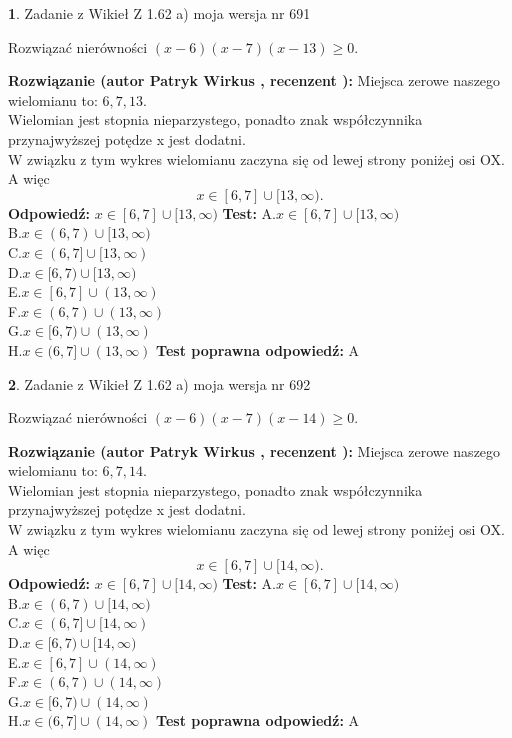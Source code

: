 \documentclass[12pt, a4paper]{article}
\theoremstyle{definition} %
\newtheorem{zad}{}
\newcommand{\zadStart}[1]{\begin{zad}#1\newline}
\newcommand{\zadStop}{\end{zad}}
\newcommand{\rozwStart}[2]{\noindent \textbf{Rozwiązanie (autor #1 , recenzent #2): }\newline}
\newcommand{\rozwStop}{\newline}
\newcommand{\odpStart}{\noindent \textbf{Odpowiedź:}\newline}
\newcommand{\odpStop}{\newline}
\newcommand{\testStart}{\noindent \textbf{Test:}\newline}
\newcommand{\testStop}{\newline}
\newcommand{\kluczStart}{\noindent \textbf{Test poprawna odpowiedź:}\newline}
\newcommand{\kluczStop}{\newline}
\begin{document}
\zadStart{Zadanie z Wikieł Z 1.62 a) moja wersja nr 691}

Rozwiązać nierówności $(x-6)(x-7)(x-13)\ge0$.
\zadStop
\rozwStart{Patryk Wirkus}{}
Miejsca zerowe naszego wielomianu to: $6, 7, 13$.\\
Wielomian jest stopnia nieparzystego, ponadto znak współczynnika przy\linebreak najwyższej potędze x jest dodatni.\\ W związku z tym wykres wielomianu zaczyna się od lewej strony poniżej osi OX. A więc $$x \in [6,7] \cup [13,\infty).$$
\rozwStop
\odpStart
$x \in [6,7] \cup [13,\infty)$
\odpStop
\testStart
A.$x \in [6,7] \cup [13,\infty)$\\
B.$x \in (6,7) \cup [13,\infty)$\\
C.$x \in (6,7] \cup [13,\infty)$\\
D.$x \in [6,7) \cup [13,\infty)$\\
E.$x \in [6,7] \cup (13,\infty)$\\
F.$x \in (6,7) \cup (13,\infty)$\\
G.$x \in [6,7) \cup (13,\infty)$\\
H.$x \in (6,7] \cup (13,\infty)$
\testStop
\kluczStart
A
\kluczStop



\zadStart{Zadanie z Wikieł Z 1.62 a) moja wersja nr 692}

Rozwiązać nierówności $(x-6)(x-7)(x-14)\ge0$.
\zadStop
\rozwStart{Patryk Wirkus}{}
Miejsca zerowe naszego wielomianu to: $6, 7, 14$.\\
Wielomian jest stopnia nieparzystego, ponadto znak współczynnika przy\linebreak najwyższej potędze x jest dodatni.\\ W związku z tym wykres wielomianu zaczyna się od lewej strony poniżej osi OX. A więc $$x \in [6,7] \cup [14,\infty).$$
\rozwStop
\odpStart
$x \in [6,7] \cup [14,\infty)$
\odpStop
\testStart
A.$x \in [6,7] \cup [14,\infty)$\\
B.$x \in (6,7) \cup [14,\infty)$\\
C.$x \in (6,7] \cup [14,\infty)$\\
D.$x \in [6,7) \cup [14,\infty)$\\
E.$x \in [6,7] \cup (14,\infty)$\\
F.$x \in (6,7) \cup (14,\infty)$\\
G.$x \in [6,7) \cup (14,\infty)$\\
H.$x \in (6,7] \cup (14,\infty)$
\testStop
\kluczStart
A
\kluczStop
\end{document}
